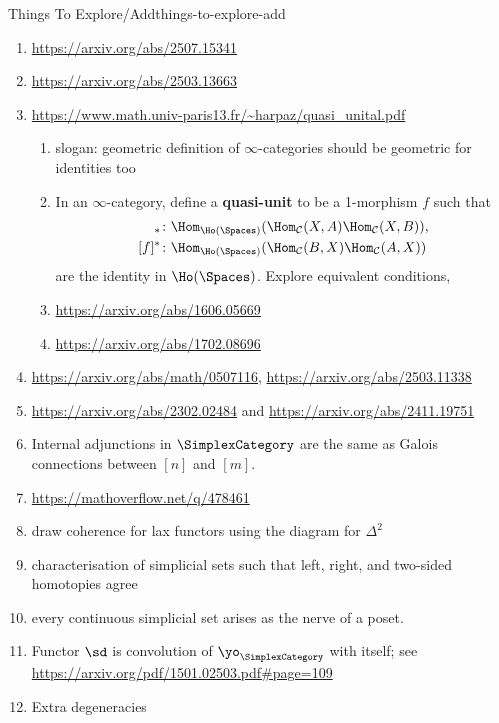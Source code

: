 \begin{remark}{Things To Explore/Add}{things-to-explore-add}
\begin{enumerate}
        \item \url{https://arxiv.org/abs/2507.15341}
        \item \url{https://arxiv.org/abs/2503.13663}
        \item \url{https://www.math.univ-paris13.fr/~harpaz/quasi_unital.pdf}
            \begin{enumerate}
                \item slogan: geometric definition of $\infty$-categories should be geometric for identities too
                \item In an $\infty$-category, define a \textbf{quasi-unit} to be a 1-morphism $f$ such that
                    \begin{align*}
                        [f]_{*} &\colon \Hom_{\Ho(\Spaces)}(\Hom_{\mathcal{C}}(X,A)\Hom_{\mathcal{C}}(X,B)),\\
                        [f]^{*} &\colon \Hom_{\Ho(\Spaces)}(\Hom_{\mathcal{C}}(B,X)\Hom_{\mathcal{C}}(A,X))
                    \end{align*}
                    are the identity in $\Ho(\Spaces)$. Explore equivalent conditions,
                \item \url{https://arxiv.org/abs/1606.05669}
                \item \url{https://arxiv.org/abs/1702.08696}
            \end{enumerate}
        \item \url{https://arxiv.org/abs/math/0507116}, \url{https://arxiv.org/abs/2503.11338}
        \item \url{https://arxiv.org/abs/2302.02484} and \url{https://arxiv.org/abs/2411.19751}
        \item Internal adjunctions in $\SimplexCategory$ are the same as Galois connections between $[n]$ and $[m]$.
        \item \url{https://mathoverflow.net/q/478461}
        \item draw coherence for lax functors using the diagram for $\Delta^{2}$
        \item characterisation of simplicial sets such that left, right, and two-sided homotopies agree
        \item every continuous simplicial set arises as the nerve of a poset.
        \item Functor $\sd$ is convolution of $\yo_{\SimplexCategory}$ with itself; see \url{https://arxiv.org/pdf/1501.02503.pdf#page=109}
        \item Extra degeneracies
            \begin{enumerate}

\end{enumerate}
\end{enumerate}
\end{remark}
